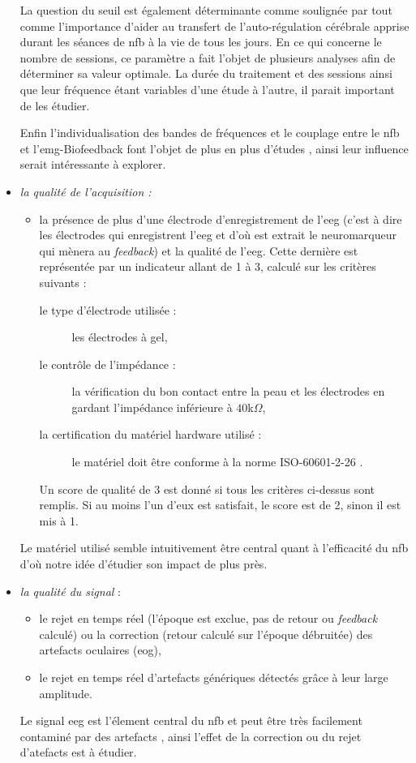 \begin{itemize}
La question du seuil est également déterminante comme soulignée par \citet{Arns2014, Strehl2014} tout comme l'importance d'aider au transfert de l'auto-régulation cérébrale
apprise durant les séances de \gls{nfb} à la vie de tous les jours. En ce qui concerne le nombre de sessions, ce paramètre a fait l'objet de plusieurs analyses \citep{Cortese2016, Arns2009,
Arns2014, Enriquez2017} afin de déterminer sa valeur optimale. La durée du traitement et des sessions ainsi que leur fréquence étant variables d'une étude à l'autre, il parait important
de les étudier. 

Enfin l'individualisation des bandes de fréquences et le couplage entre le \gls{nfb} et l'\gls{emg}-Biofeedback font l'objet de plus en plus d'études \citep{Bioulac2019, Bazanova2018, Bink2014,
Duric2012, Enriquez2017}, ainsi leur influence serait intéressante à explorer.
\item \emph{la qualité de l'acquisition :} 
    \begin{itemize}
    \item la présence de plus d'une électrode d'enregistrement de l'\gls{eeg} (c'est à dire les électrodes qui enregistrent l'\gls{eeg} et d'où 
		est extrait le neuromarqueur qui mènera au \textit{feedback}) et la qualité de 
		l'\gls{eeg}. Cette dernière est représentée par un indicateur allant de 1 à 3, calculé sur les critères suivants : 
        \begin{description} 
        \item[le type d'électrode utilisée :] les électrodes à gel,
        \item[le contrôle de l'impédance :] la vérification du bon contact entre la peau et les électrodes en gardant l'impédance inférieure à $40$k$\Omega$,
        \item[la certification du matériel hardware utilisé :] le matériel doit être conforme à la norme ISO-60601-2-26 \citep{ISO}.
        \end{description}
    Un score de qualité de 3 est donné si tous les critères ci-dessus sont remplis. Si au moins l'un d'eux est satisfait, le score est de 2, sinon il est mis à 1.
		\end{itemize}
Le matériel utilisé semble intuitivement être central quant à l'efficacité du \gls{nfb} d'où notre idée d'étudier son impact de plus près.
\item \emph{la qualité du signal} : 
    \begin{itemize}
    \item le rejet en temps réel (l'époque est exclue, pas de retour ou \emph{feedback} calculé) ou la correction (retour calculé sur l'époque débruitée) des 
artefacts oculaires (\gls{eog}),
    \item le rejet en temps réel d'artefacts génériques détectés grâce à leur large amplitude. 
    \end{itemize}
Le signal \gls{eeg} est l'élement central du \gls{nfb} et peut être très facilement contaminé par des artefacts \citep{Chavez2018}, ainsi l'effet de la correction ou du rejet 
d'atefacts est à étudier. 
\end{itemize}

